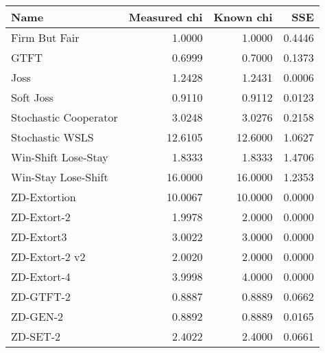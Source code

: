 \begin{tabular}{lrrr}
\toprule
                  Name &  Measured chi &  Known chi &     SSE \\
\midrule
         Firm But Fair &        1.0000 &     1.0000 &  0.4446 \\
                  GTFT &        0.6999 &     0.7000 &  0.1373 \\
                  Joss &        1.2428 &     1.2431 &  0.0006 \\
             Soft Joss &        0.9110 &     0.9112 &  0.0123 \\
 Stochastic Cooperator &        3.0248 &     3.0276 &  0.2158 \\
       Stochastic WSLS &       12.6105 &    12.6000 &  1.0627 \\
   Win-Shift Lose-Stay &        1.8333 &     1.8333 &  1.4706 \\
   Win-Stay Lose-Shift &       16.0000 &    16.0000 &  1.2353 \\
          ZD-Extortion &       10.0067 &    10.0000 &  0.0000 \\
           ZD-Extort-2 &        1.9978 &     2.0000 &  0.0000 \\
            ZD-Extort3 &        3.0022 &     3.0000 &  0.0000 \\
        ZD-Extort-2 v2 &        2.0020 &     2.0000 &  0.0000 \\
           ZD-Extort-4 &        3.9998 &     4.0000 &  0.0000 \\
             ZD-GTFT-2 &        0.8887 &     0.8889 &  0.0662 \\
              ZD-GEN-2 &        0.8892 &     0.8889 &  0.0165 \\
              ZD-SET-2 &        2.4022 &     2.4000 &  0.0661 \\
\bottomrule
\end{tabular}
